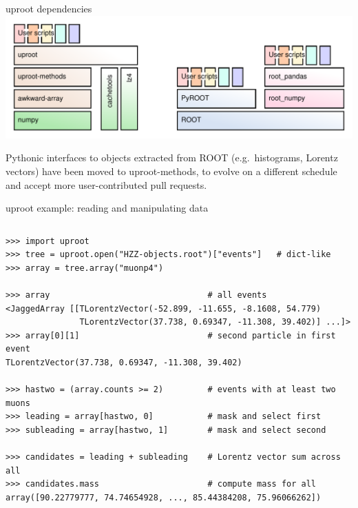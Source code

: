 \documentclass[aspectratio=169]{beamer}
\begin{document}
\begin{frame}{uproot dependencies}
\vspace{0.5 cm}
\includegraphics[width=\linewidth]{abstraction-layers.pdf}

\vspace{0.5 cm}
Pythonic interfaces to objects extracted from ROOT (e.g.\ histograms, Lorentz vectors) have been moved to uproot-methods, to evolve on a different schedule and accept more user-contributed pull requests.
\end{frame}

\begin{frame}[fragile]{uproot example: reading and manipulating data}
\small
\vspace{0.1 cm}
\begin{columns}
\begin{verbatim}
>>> import uproot
>>> tree = uproot.open("HZZ-objects.root")["events"]   # dict-like
>>> array = tree.array("muonp4")

>>> array                                # all events
<JaggedArray [[TLorentzVector(-52.899, -11.655, -8.1608, 54.779)
               TLorentzVector(37.738, 0.69347, -11.308, 39.402)] ...]>
>>> array[0][1]                          # second particle in first event
TLorentzVector(37.738, 0.69347, -11.308, 39.402)

>>> hastwo = (array.counts >= 2)         # events with at least two muons
>>> leading = array[hastwo, 0]           # mask and select first
>>> subleading = array[hastwo, 1]        # mask and select second

>>> candidates = leading + subleading    # Lorentz vector sum across all
>>> candidates.mass                      # compute mass for all
array([90.22779777, 74.74654928, ..., 85.44384208, 75.96066262])
\end{verbatim}
\end{columns}
\end{frame}
\end{document}
